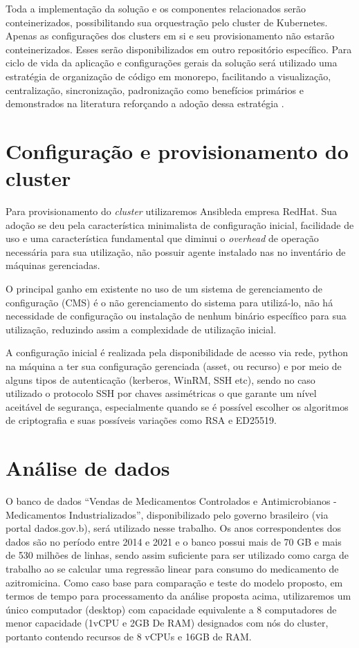 Toda a implementação da solução e os componentes relacionados serão conteinerizados, possibilitando  sua orquestração pelo cluster de Kubernetes\textregistered. Apenas as configurações dos clusters em si e seu provisionamento não estarão conteinerizados. Esses serão disponibilizados em outro repositório específico. 
Para ciclo de vida da aplicação e configurações gerais da solução será utilizado uma estratégia de organização de código em monorepo, facilitando a visualização, centralização, sincronização, padronização como benefícios primários e demonstrados na literatura reforçando a adoção dessa estratégia \cite{brito_monorepos_2018}.
\section{Configuração e provisionamento do cluster}
Para provisionamento do \emph{cluster} utilizaremos Ansible\textregistered da empresa RedHat\textregistered. Sua adoção se deu pela característica minimalista de configuração inicial, facilidade de uso e uma característica fundamental que diminui o \emph{overhead} de operação necessária para sua utilização, não possuir agente instalado nas no inventário de máquinas gerenciadas. 

O principal ganho em existente no uso de um sistema de gerenciamento de configuração (CMS) é o não gerenciamento do sistema para utilizá-lo, não há necessidade de configuração ou instalação de nenhum binário específico para sua utilização, reduzindo assim a complexidade de utilização inicial.

A configuração inicial é realizada pela disponibilidade de acesso via rede, python na máquina a ter sua configuração gerenciada (asset, ou recurso) e por meio de alguns tipos de autenticação (kerberos, WinRM, SSH etc), sendo no caso utilizado o protocolo SSH \cite{noauthor_rfc4254_nodate} por chaves assimétricas o que garante um nível aceitável de segurança, especialmente quando se é possível escolher os algoritmos de criptografia e suas possíveis variações como RSA e ED25519.

\section{Análise de dados}

O banco de dados “Vendas de Medicamentos Controlados e Antimicrobianos - Medicamentos Industrializados”, disponibilizado pelo governo brasileiro (via portal dados.gov.b), será utilizado nesse trabalho. Os anos correspondentes dos dados são no período entre 2014 e 2021 e o banco possui mais de 70 GB  e mais de 530 milhões de linhas, sendo assim suficiente para ser utilizado como carga de trabalho ao se calcular uma regressão linear para consumo do medicamento de azitromicina.
Como caso base para comparação e teste do modelo proposto, em termos de tempo para processamento da análise proposta acima,  utilizaremos um único computador (desktop) com capacidade equivalente a 8 computadores de menor capacidade (1vCPU e 2GB De RAM) designados com nós do cluster, portanto contendo recursos de  8 vCPUs e 16GB de RAM. 

